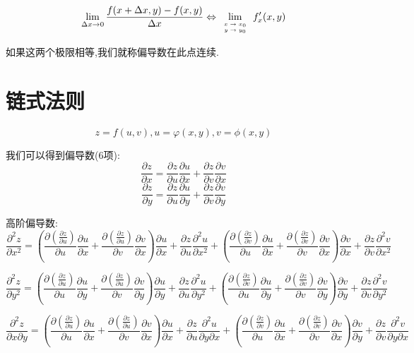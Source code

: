 \begin{definition}[偏导数连续性]
	
	$$\lim\limits_{\Delta x\rightarrow 0}\frac{f(x+\Delta x,y)-f(x,y)}{\Delta x}\Leftrightarrow\lim\limits_{\mbox{\tiny$\begin{array}{c} 
				x\rightarrow x_{0}\\ 
				y\rightarrow y_{0}\\ 
			\end{array}$}}f_{x}'(x,y)$$
	
	如果这两个极限相等,我们就称偏导数在此点连续.
\end{definition}
\section{链式法则}

\begin{definition}[链式法则]\label{def: 链式法则}
	$$z=f(u,v),u=\varphi(x,y),v=\phi(x,y)$$
	
	我们可以得到偏导数(6项): 
	$$\frac{\partial z}{\partial x}=\frac{\partial z}{\partial u}\frac{\partial u}{\partial x}+\frac{\partial z}{\partial v}\frac{\partial v}{\partial x}$$
	$$\frac{\partial z}{\partial y}=\frac{\partial z}{\partial u}\frac{\partial u}{\partial y}+\frac{\partial z}{\partial v}\frac{\partial v}{\partial y}$$
	
	高阶偏导数: 
	$$\frac{\partial^2 z}{\partial x^2}=(\frac{\partial (\frac{\partial z}{\partial u})}{\partial u}\frac{\partial u}{\partial x}+\frac{\partial (\frac{\partial z}{\partial u})}{\partial v}\frac{\partial v}{\partial x})\frac{\partial u}{\partial x}+\frac{\partial z}{\partial u}\frac{\partial ^2u}{\partial x^2}+(\frac{\partial (\frac{\partial z}{\partial v})}{\partial u}\frac{\partial u}{\partial x}+\frac{\partial (\frac{\partial z}{\partial v})}{\partial v}\frac{\partial v}{\partial x})\frac{\partial v}{\partial x}+\frac{\partial z}{\partial v}\frac{\partial ^2v}{\partial x^2}$$
	
	$$\frac{\partial^2 z}{\partial y^2}=(\frac{\partial (\frac{\partial z}{\partial u})}{\partial u}\frac{\partial u}{\partial y}+\frac{\partial (\frac{\partial z}{\partial u})}{\partial v}\frac{\partial v}{\partial y})\frac{\partial u}{\partial y}+\frac{\partial z}{\partial u}\frac{\partial ^2u}{\partial y^2}+(\frac{\partial (\frac{\partial z}{\partial v})}{\partial u}\frac{\partial u}{\partial y}+\frac{\partial (\frac{\partial z}{\partial v})}{\partial v}\frac{\partial v}{\partial y})\frac{\partial v}{\partial y}+\frac{\partial z}{\partial v}\frac{\partial ^2v}{\partial y^2}$$
	
	$$\frac{\partial^2 z}{\partial x\partial y}=(\frac{\partial (\frac{\partial z}{\partial u})}{\partial u}\frac{\partial u}{\partial x}+\frac{\partial (\frac{\partial z}{\partial u})}{\partial v}\frac{\partial v}{\partial x})\frac{\partial u}{\partial x}+\frac{\partial z}{\partial u}\frac{\partial ^2u}{\partial y\partial x}+(\frac{\partial (\frac{\partial z}{\partial v})}{\partial u}\frac{\partial u}{\partial x}+\frac{\partial (\frac{\partial z}{\partial v})}{\partial v}\frac{\partial v}{\partial x})\frac{\partial v}{\partial y}+\frac{\partial z}{\partial v}\frac{\partial ^2v}{\partial y\partial x}$$
\end{definition}

